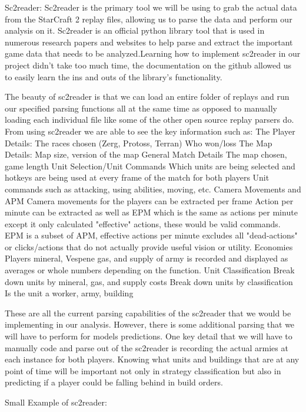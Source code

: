 \documentclass[a4paper,12pt]{report}
\begin{document}
Sc2reader:
Sc2reader is the primary tool we will be using to grab the actual data from the StarCraft 2 replay files, allowing us to parse the data and perform our analysis on it. Sc2reader is an official python library tool that is used in numerous research papers and websites to help parse and extract the important game data that needs to be analyzed.Learning how to implement sc2reader in our project didn’t take too much time, the documentation on the github allowed us to easily learn the ins and outs of the library's functionality.

The beauty of sc2reader is that we can load an entire folder of replays and run our specified parsing functions all at the same time as opposed to manually loading each individual file like some of the other open source replay parsers do.
From using sc2reader we are able to see the key information such as:
The Player Details:
The races chosen (Zerg, Protoss, Terran)
Who won/loss
The Map Details:
Map size, version of the map
 General Match Details
The map chosen, game length
Unit Selection/Unit Commands
Which units are being selected and hotkeys are being used at every frame of the match for both players
Unit commands such as attacking, using abilities, moving, etc.
Camera Movements and APM
 Camera movements for the players can be extracted per frame
Action per minute can be extracted as well as EPM which is the same as actions per minute except it only calculated "effective" actions, these would be valid commands.
EPM is a subset of APM, effective actions per minute excludes all "dead-actions" or clicks/actions that do not actually provide useful vision or utility.
 Economies
Players mineral, Vespene gas, and supply of army is recorded and displayed as averages or whole numbers depending on the function. 
 Unit Classification
Break down units by mineral, gas, and supply costs
 Break down units by classification
Is the unit a worker, army, building

These are all the current parsing capabilities of the sc2reader that we would be implementing in our analysis. However, there is some additional parsing that we will have to perform for models predictions. One key detail that we will have to manually code and parse out of the sc2reader is recording the actual armies at each instance for both players. Knowing what units and buildings that are at any point of time will be important not only in strategy classification but also in predicting if a player could be falling behind in build orders.


Small Example of sc2reader:
\end{document}
